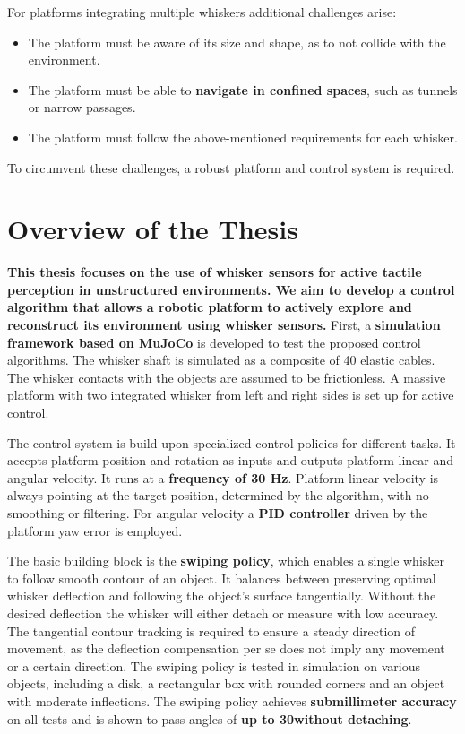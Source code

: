 For platforms integrating multiple whiskers additional challenges arise:
\begin{itemize}
    \item The platform must be aware of its size and shape, as to not collide with the environment.
    \item The platform must be able to \textbf{navigate in confined spaces}, such as tunnels or narrow passages.
    \item The platform must follow the above-mentioned requirements for each whisker.
\end{itemize}

To circumvent these challenges, a robust platform and control system is required.


\section{Overview of the Thesis}

\textbf{This thesis focuses on the use of whisker sensors for active tactile perception in unstructured environments.
We aim to develop a control algorithm that allows a robotic platform to actively explore and reconstruct its environment using whisker sensors.}
First, a \textbf{simulation framework based on MuJoCo} is developed to test the proposed control algorithms.
The whisker shaft is simulated as a composite of 40 elastic cables.
The whisker contacts with the objects are assumed to be frictionless.
A massive platform with two integrated whisker from left and right sides is set up for active control.

The control system is build upon specialized control policies for different tasks.
It accepts platform position and rotation as inputs and outputs platform linear and angular velocity.
It runs at a \textbf{frequency of 30 Hz}.
Platform linear velocity is always pointing at the target position, determined by the algorithm, with no smoothing or filtering.
For angular velocity a \textbf{PID controller} driven by the platform yaw error is employed.

The basic building block is the \textbf{swiping policy}, which enables a single whisker to follow smooth contour of an object.
It balances between preserving optimal whisker deflection and following the object's surface tangentially.
Without the desired deflection the whisker will either detach or measure with low accuracy.
The tangential contour tracking is required to ensure a steady direction of movement, as the deflection compensation per se does not imply any movement or a certain direction.
The swiping policy is tested in simulation on various objects, including a disk, a rectangular box with rounded corners and an object with moderate inflections.
The swiping policy achieves \textbf{submillimeter accuracy} on all tests and is shown to pass angles of \textbf{up to 30\degree without detaching}.

